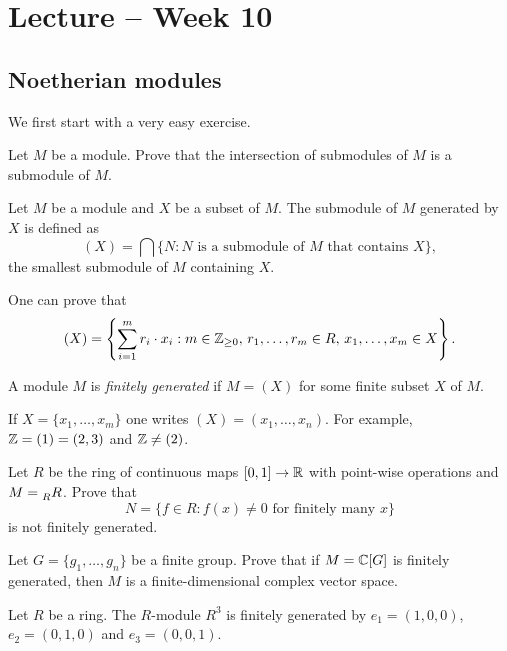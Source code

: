 \section{Lecture -- Week 10}

\subsection{Noetherian modules}

We first start with a very easy exercise. 

\begin{exercise}
\label{xca:modules_intersection}
    Let $M$ be a module. 
    Prove that the intersection of submodules of $M$ 
    is a submodule of $M$. 
\end{exercise}

\begin{definition}
Let $M$ be a module and $X$ be a subset of $M$. The submodule
of $M$ generated by $X$ is defined as
\[
(X)=\bigcap\{N:N\text{ is a submodule of $M$ that contains $X$}\},
\]
the smallest submodule of $M$ containing $X$. 
\end{definition}

One can prove that  
\[
(X)=\left\{\sum_{i=1}^mr_i\cdot x_i:m\in\mathbb{Z}_{\geq0},\,r_1,\dots,r_m\in R,\,x_1,\dots,x_m\in X\right\}.
\]

\begin{definition}
    A module $M$ is \emph{finitely generated} if $M=(X)$ for some finite subset $X$ of $M$.
\end{definition}

If $X=\{x_1,\dots,x_m\}$ one writes $(X)=(x_1,\dots,x_n)$.
For example, $\mathbb{Z}=(1)=(2,3)$ and $\mathbb{Z}\ne (2)$.

\begin{exercise}
    Let $R$ be the ring of continuous maps $[0,1]\to\mathbb{R}$ with point-wise operations and 
    $M=\prescript{}{R}{R}$. Prove that
    \[ 
    N=\{f\in R:f(x)\ne0\text{ for finitely many $x$}\}
    \]
    is not finitely generated. 
\end{exercise}

\begin{exercise}
    Let $G=\{g_1,\dots,g_n\}$ be a finite group. Prove that if $M=\mathbb{C}[G]$ is finitely generated, then
    $M$ is a finite-dimensional complex vector space. 
\end{exercise}

\begin{example}
    Let $R$ be a ring. The $R$-module $R^3$ is finitely generated 
    by $e_1=(1,0,0)$, $e_2=(0,1,0)$ and $e_3=(0,0,1)$. 
\end{example}


